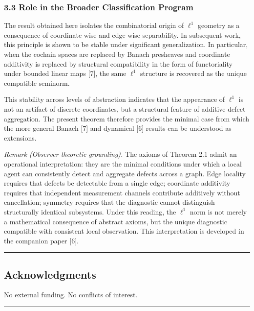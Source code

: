 \documentclass[
]{article}
\begin{document}
\subsubsection{3.3 Role in the Broader Classification
Program}\label{role-in-the-broader-classification-program}

The result obtained here isolates the combinatorial origin of \(\ell^1\)
geometry as a consequence of coordinate-wise and edge-wise separability.
In subsequent work, this principle is shown to be stable under
significant generalization. In particular, when the cochain spaces are
replaced by Banach presheaves and coordinate additivity is replaced by
structural compatibility in the form of functoriality under bounded
linear maps {[}7{]}, the same \(\ell^1\) structure is recovered as the
unique compatible seminorm.

This stability across levels of abstraction indicates that the
appearance of \(\ell^1\) is not an artifact of discrete coordinates, but
a structural feature of additive defect aggregation. The present theorem
therefore provides the minimal case from which the more general Banach
{[}7{]} and dynamical {[}6{]} results can be understood as extensions.

\emph{Remark (Observer-theoretic grounding).} The axioms of Theorem 2.1
admit an operational interpretation: they are the minimal conditions
under which a local agent can consistently detect and aggregate defects
across a graph. Edge locality requires that defects be detectable from a
single edge; coordinate additivity requires that independent measurement
channels contribute additively without cancellation; symmetry requires
that the diagnostic cannot distinguish structurally identical
subsystems. Under this reading, the \(\ell^1\) norm is not merely a
mathematical consequence of abstract axioms, but the unique diagnostic
compatible with consistent local observation. This interpretation is
developed in the companion paper {[}6{]}.

\begin{center}\rule{0.5\linewidth}{0.5pt}\end{center}

\subsection{Acknowledgments}\label{acknowledgments}

No external funding. No conflicts of interest.

\begin{center}\rule{0.5\linewidth}{0.5pt}\end{center}
\end{document}
